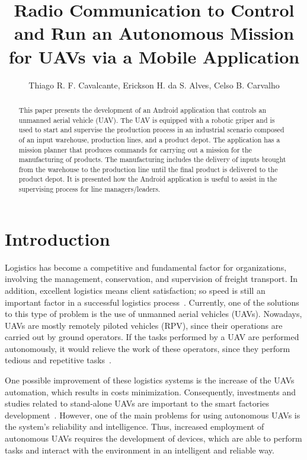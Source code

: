 \documentclass[12pt]{article}
\title{Radio Communication to Control and Run an Autonomous Mission for UAVs via a Mobile Application}
\author{Thiago R. F. Cavalcante\inst{1,2}, Erickson H. da S. Alves\inst{1,2}, Celso B. Carvalho\inst{1,2,3} }
\begin{document}
 

\maketitle

\begin{abstract}
  This paper presents the development of an Android application that controls an unmanned aerial vehicle (UAV). The UAV is equipped with a robotic griper and is used to start and supervise the production process in an industrial scenario composed of an input warehouse, production lines, and a product depot. The application has a mission planner that produces commands for carrying out a mission for the manufacturing of products. The manufacturing includes the delivery of inputs brought from the warehouse to the production line until the final product is delivered to the product depot. It is presented how the Android application is useful to assist in the supervising process for line managers/leaders.
\end{abstract}


\section{Introduction}
\label{sec:introduction}

Logistics has become a competitive and fundamental factor for organizations, involving the management, conservation, and supervision of freight transport. In addition, excellent logistics means client satisfaction; so speed is still an important factor in a successful logistics process~\cite{drone4logistic}. Currently, one of the solutions to this type of problem is the use of unmanned aerial vehicles (UAVs). Nowadays, UAVs are mostly remotely piloted vehicles (RPV), since their operations are carried out by ground operators. If the tasks performed by a UAV are performed autonomously, it would relieve the work of these operators, since they perform tedious and repetitive tasks~\cite{pascarella2013autonomic}.

One possible improvement of these logistics systems is the increase of the UAVs automation, which results in costs minimization. Consequently, investments and studies related to stand-alone UAVs are important to the smart factories development~\cite{hern2014dhl}. However, one of the main problems for using autonomous UAVs is the system's reliability and intelligence. Thus, increased employment of autonomous UAVs requires the development of devices, which are able to perform tasks and interact with the environment in an intelligent and reliable way.
\end{document}
